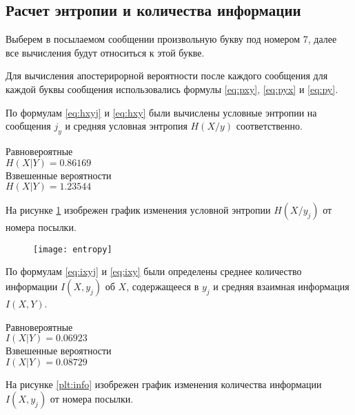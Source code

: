 \subsection{Расчет энтропии и количества информации}

Выберем в посылаемом сообщении произвольную букву под номером 7, далее все вычисления будут относиться к этой букве.

Для вычисления апостерирорной вероятности после каждого сообщения для каждой буквы сообщения использовались формулы \ref{eq:pxy}, \ref{eq:pyx} и \ref{eq:py}.

По формулам \ref{eq:hxyj} и \ref{eq:hxy} были вычислены условные энтропии на сообщения $j_y$ и средняя условная энтропия $H(X/y)$ соответственно. 

\begin{multicols}{2}
\begin{center}
Равновероятные\\
$H(X|Y) = 0.86169$\\
Взвешенные вероятности\\
$H(X|Y) = 1.23544$
\end{center}
\end{multicols}

На рисунке \ref{plt:entropy} изобрежен график изменения условной энтропии $H(X/y_j)$ от номера посылки.

\begin{figure}[H]
\begin{center}
	\vspace{-0.5cm}
	\texttt{[image: entropy]}
	\caption{}
	\label{plt:entropy}
	\vspace{-0.5cm}
\end{center}
\end{figure}

По формулам \ref{eq:ixyj} и \ref{eq:ixy} были определены среднее количество информации $I(X, y_j)$ об $X$, содержащееся в $y_j$ и средняя взаимная информация $I(X, Y)$.

\begin{multicols}{2}
\begin{center}
Равновероятные\\
$I(X|Y) = 0.06923$\\
Взвешенные вероятности\\
$I(X|Y) = 0.08729$
\end{center}
\end{multicols}

На рисунке \ref{plt:info} изобрежен график изменения количества
информации $I(X, y_j)$ от номера посылки.

